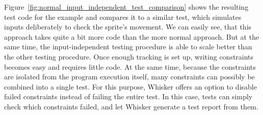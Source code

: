 Figure~\ref{fig:normal_input_independent_test_comparison} shows the resulting test code for the example
and compares it to a similar test, which simulates inputs deliberately to check the sprite's movement.
We can easily see, that this approach takes quite a bit more code than the more normal approach.
But at the same time, the input-independent testing procedure is able to scale better than the other testing procedure.
Once enough tracking is set up, writing constraints becomes easy and requires little code.
At the same time, because the constraints are isolated from the program execution itself,
many constraints can possibly be combined into a single test.
For this purpose, Whisker offers an option to disable failed constraints instead of failing the entire test.
In this case, tests can simply check which constraints failed, and let Whisker generate a test report from them.

